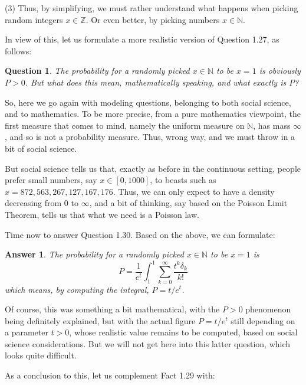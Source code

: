 \documentclass[12pt]{amsbook}
\newtheorem{answer}[theorem]{Answer}
\newtheorem{question}[theorem]{Question}
\begin{document}
\bigskip

(3) Thus, by simplifying, we must rather understand what happens when picking random integers $x\in\mathbb Z$. Or even better, by picking numbers $x\in\mathbb N$.

\bigskip

In view of this, let us formulate a more realistic version of Question 1.27, as follows:

\begin{question}
The probability for a randomly picked $x\in\mathbb N$ to be $x=1$ is obviously $P>0$. But what does this mean, mathematically speaking, and what exactly is $P$?
\end{question} 

So, here we go again with modeling questions, belonging to both social science, and to mathematics. To be more precise, from a pure mathematics viewpoint, the first measure that comes to mind, namely the uniform measure on $\mathbb N$, has mass $\infty$, and so is not a probability measure. Thus, wrong way, and we must throw in a bit of social science.

\bigskip

But social science tells us that, exactly as before in the continuous setting, people prefer small numbers, say $x\in[0,1000]$, to beasts such as $x=872,563,267,127,167,176$. Thus, we can only expect to have a density decreasing from 0 to $\infty$, and a bit of thinking, say based on the Poisson Limit Theorem, tells us that what we need is a Poisson law.

\bigskip

Time now to answer Question 1.30. Based on the above, we can formulate: 


\begin{answer}
The probability for a randomly picked $x\in\mathbb N$ to be $x=1$ is
$$P=\frac{1}{e^t}\int_1^1\sum_{k=0}^\infty\frac{t^k\delta_k}{k!}$$
which means, by computing the integral, $P=t/e^t$.
\end{answer}

Of course, this was something a bit mathematical, with the $P>0$ phenomenon being definitely explained, but with the actual figure $P=t/e^t$ still depending on a parameter $t>0$, whose realistic value remains to be computed, based on social science considerations. But we will not get here into this latter question, which looks quite difficult.

\bigskip

As a conclusion to this, let us complement Fact 1.29 with:
\end{document}
